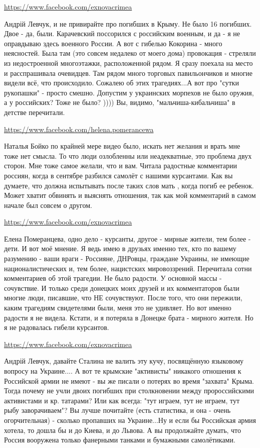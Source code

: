\documentclass[a4paper,11pt]{extreport}
\begin{document}
\begin{itemize}
\begin{itemize}
\url{https://www.facebook.com/exnovacrimea}

Андрій Левчук, и не привирайте про погибших в Крыму. Не было 16 погибших. Двое - да, были. Карачевский поссорился с российским военным, и да - я не оправдываю здесь военного России. А вот с гибелью Кокорина - много неясностей. Была там (это совсем недалеко от моего дома) провокация - стреляли из недостроенной многоэтажки, расположенной рядом. Я сразу поехала на место и расспрашивала очевидцев. Там рядом много торговых павильончиков и многие видели всё, что происходило. Сожалею об этих трагедиях...А вот про "сутки рукопашки" - просто смешно. Допустим у украинских морпехов не было оружия, а у российских? Тоже не было? )))) Вы, видимо, "мальчиша-кибальчиша" в детстве перечитали.

\url{https://www.facebook.com/helena.pomerancewa}

Наталья Бойко по крайней мере видео было, искать нет желания и врать мне тоже нет смысла.
То что люди озлобленны или неадекватные, это проблема двух сторон. Мне тоже самое желали, что и вам. Читала радостные комментарии россиян, когда в сентябре разбился самолёт с нашими курсантами. Как вы думаете, что должна испытывать после таких слов мать , когда погиб ее ребенок.
Может хватит обвинять и выяснять отношения, так как мой комментарий в самом начале был совсем о другом.

\url{https://www.facebook.com/exnovacrimea}

Елена Померанцева, одно дело - курсанты, другое - мирные жители, тем более - дети. И вот моё мнение. Я ведь имею в друзьях именно тех, кто по вашему разумению - ваши враги - Россияне, ДНРовцы, граждане Украины, не имеющие националистических и, тем более, нацистских мировоззрений. Перечитала сотни комментариев об этой трагедии. Не было радости. У основной массы - сочувствие. И только среди донецких моих друзей и их комментаторов были многие люди, писавшие, что НЕ сочувствуют. После того, что они пережили, каким трагедиям свидетелями были, меня это не удивляет. Но вот именно радости я не видела. Кстати, и я потеряла в Донецке брата - мирного жителя. Но я не радовалась гибели курсантов.

\url{https://www.facebook.com/exnovacrimea}

Андрій Левчук, давайте Сталина не валить эту кучу, посвящённую языковому вопросу на Украине.... А вот те крымские "активисты" никакого отношения к Российской армии не имеют - вы же писали о потерях во время "захвата" Крыма. Тогда почему не учли двоих погибших при столкновении между пророссийскими активистами и кр. татарами? Или как всегда: "тут играем, тут не играем, тут рыбу заворачиваем"? Вы лучше почитайте (есть статистика, и она - очень огорчительная) - сколько пропавших на Украине...Ну и если бы Российская армия хотела, то дошла бы и до Киева, и до Львова. А вы продолжайте думать, что Россия вооружена только фанерными танками и бумажными самолётиками.


\end{itemize}
\end{itemize}
\end{document}
